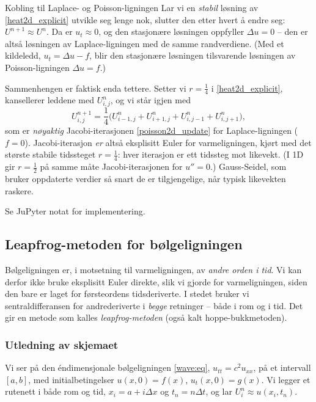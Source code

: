 \begin{rem}{Kobling til Laplace- og Poisson-ligningen}
Lar vi en \emph{stabil} løsning av \eqref{heat2d_explicit} utvikle seg lenge nok, slutter den etter hvert å endre seg: $U^{n+1}\approx U^n$. Da er $u_t\approx0$, og den stasjonære løsningen oppfyller $\Delta u=0$ -- den er altså løsningen av Laplace-ligningen med de samme randverdiene. (Med et kildeledd, $u_t=\Delta u-f$, blir den stasjonære løsningen tilsvarende løsningen av Poisson-ligningen $\Delta u=f$.)

\medskip
Sammenhengen er faktisk enda tettere. Setter vi $r=\frac14$ i \eqref{heat2d_explicit}, kansellerer leddene med $U_{i,j}^n$, og vi står igjen med
\[
U_{i,j}^{n+1} = \frac14\Big(U_{i-1,j}^n+U_{i+1,j}^n+U_{i,j-1}^n+U_{i,j+1}^n\Big),
\]
som er \emph{nøyaktig} Jacobi-iterasjonen \eqref{poisson2d_update} for Laplace-ligningen ($f=0$). Jacobi-iterasjon \emph{er} altså eksplisitt Euler for varmeligningen, kjørt med det største stabile tidssteget $r=\frac14$: hver iterasjon er ett tidssteg mot likevekt. (I 1D gir $r=\frac12$ på samme måte Jacobi-iterasjonen for $u''=0$.) Gauss-Seidel, som bruker oppdaterte verdier så snart de er tilgjengelige, når typisk likevekten raskere.
\end{rem}

Se JuPyter notat for implementering.

\subsection{Leapfrog-metoden for bølgeligningen}\label{sect:leapfrog}

Bølgeligningen er, i motsetning til varmeligningen, av \emph{andre orden i tid}. Vi kan derfor ikke bruke eksplisitt Euler direkte, slik vi gjorde for varmeligningen, siden den bare er laget for førsteordens tidsderiverte. I stedet bruker vi sentraldifferansen for andrederiverte i \emph{begge} retninger -- både i rom og i tid. Det gir en metode som kalles \emph{leapfrog-metoden} (også kalt hoppe-bukkmetoden).

\subsubsection*{Utledning av skjemaet}
Vi ser på den éndimensjonale bølgeligningen \eqref{wave:eq}, $u_{tt}=c^2u_{xx}$, på et intervall $[a,b]$, med initialbetingelser $u(x,0)=f(x)$, $u_t(x,0)=g(x)$. Vi legger et rutenett i både rom og tid, $x_i=a+i\Delta x$ og $t_n=n\Delta t$, og lar $U_i^n\approx u(x_i,t_n)$.

